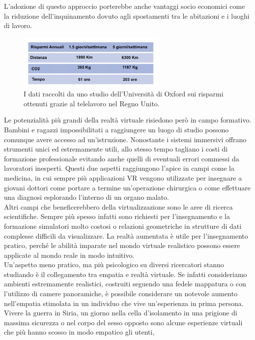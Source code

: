  L'adozione di questo approccio porterebbe anche vantaggi socio economici come la riduzione dell'inquinamento dovuto agli spostamenti tra le abitazioni e i luoghi di lavoro.  \cite{POL}
 \begin{figure}[H]
 	\includegraphics[width=0.65\textwidth]{figure/PolData}
 	\centering
 	\caption{I dati raccolti da uno studio dell'Università di Oxford sui risparmi ottenuti grazie al telelavoro nel Regno Unito.}
 \end{figure}
\newpage
Le potenzialità più grandi della realtà virtuale risiedono però in campo formativo. Bambini e ragazzi impossibilitati a raggiungere un luogo di studio possono comunque avere accesso ad un'istruzione. Nonostante i sistemi immersivi offrano strumenti unici ed estremamente utili, allo stesso tempo tagliano i costi di formazione professionale evitando anche quelli di eventuali errori commessi da lavoratori inesperti. Questi due aspetti raggiungono l'apice in campi come la medicina, in cui sempre più applicazioni VR vengono utilizzate per insegnare a giovani dottori come portare a termine un'operazione chirurgica o come effettuare una diagnosi esplorando l'interno di un organo malato. \\
Altri campi che beneficerebbero della virtualizzazione sono le aree di ricerca scientifiche. Sempre più spesso infatti sono richiesti per l'insegnamento e la formazione simulatori molto costosi o relazioni geometriche in strutture di dati complesse difficili da visualizzare.  La realtà aumentata è utile per l'insegnamento pratico, perché le abilità imparate nel mondo virtuale realistico possono essere applicate al mondo reale in modo intuitivo.\\
Un'aspetto meno pratico, ma più psicologico su diversi ricercatori stanno studiando è il  collegamento tra empatia e realtà virtuale. Se infatti consideriamo ambienti estremamente realistici, costruiti seguendo una fedele mappatura o con l'utilizzo di camere panoramiche, è possibile considerare un notevole aumento nell'empatia stimolata in un individuo che vive un'esperienza in prima persona. Vivere la guerra in Siria, un giorno  nella cella d'isolamento in una prigione di massima sicurezza o nel corpo del sesso opposto sono alcune esperienze virtuali che più hanno scosso in modo empatico gli utenti,
